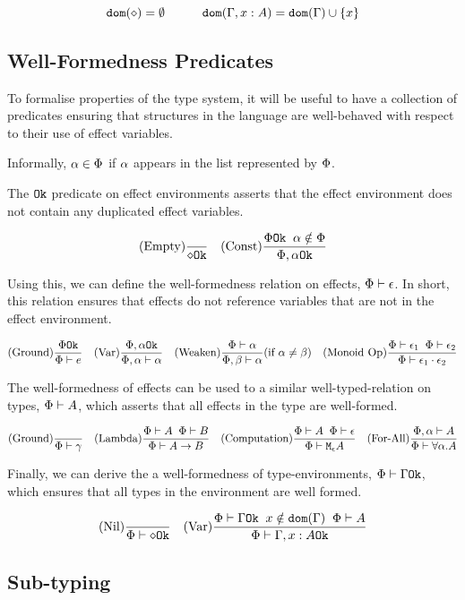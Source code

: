 \documentclass{Report}
\begin{document}
\[
    \dom{\nil} = \emptyset
    \quad\quad\quad
    \dom{\gax} =  \dom{\G}  \cup \left\{x \right\}
\]

\subsection{Well-Formedness Predicates}
To formalise properties of the type system, it will be useful to have a collection of predicates ensuring that structures in the language are well-behaved with respect to their use of effect variables.

Informally, $\a \in \P$ if $\a$ appears in the list represented by $\P$.

The $\ok{}$ predicate on effect environments asserts that the effect environment does not contain any duplicated effect variables.

\[
    \treerule{Empty}{}{\ok{\nil}}
\quad
    \treerule{Const}{\ok{\P} \s\s \a\notin \P}{\ok{\P, \a}}
\]

Using this, we can define the well-formedness relation on effects, $\wellformed{\P}{\e}$. In short, this relation ensures that effects do not reference variables that are not in the effect environment.

\[
    \treerule{Ground}{\ok{\P}}{\wellformed{\P}{e}}
    \quad
    \treerule{Var}{\ok{\P,\a}}{\wellformed{\P,\a}{\a}}
    \quad
    \condtreerule{Weaken}{\wellformed{\P}{\a}}{\wellformed{\P,\b}{\a}}{\a\neq\b}
    \quad
    \treerule{Monoid Op}{\wellformed{\P}{\e_1}\s\s\wellformed{\P}{\e_2}}{\wellformed{\P}{\e_1\dot\e_2}}
\]

The well-formedness of effects can be used to a similar well-typed-relation on types, $\wellformed{\P}{A}$, which asserts that all effects in the type are well-formed.

\[
    \treerule{Ground}{}{\wellformed{\P}{\g}}
    \quad
    \treerule{Lambda}{\wellformed{\P}{A}\s\s\wellformed{\P}{B}}{\wellformed{\P}{\ab}}
    \quad
    \treerule{Computation}{\wellformed{\P}{A}\s\s\wellformed{\P}{\e}}{\wellformed{\P}{\mea}}
    \quad
    \treerule{For-All}{\wellformed{\P,\a}{A}}{\wellformed{\P}{\all{\a}{A}}}
\]

Finally, we can derive the a well-formedness of type-environments,   $\oke{\P}{\G}$, which ensures that all types in the environment are well formed.

\[
    \treerule{Nil}{}{\oke{\P}{\nil}}
    \quad
    \treerule{Var}{\oke{\P}{\G}\s\s x\notin\dom{\G}\s\s \wellformed{\P}{A}}{\oke{\P}{\gax}}
\]

\subsection{Sub-typing}
\end{document}
